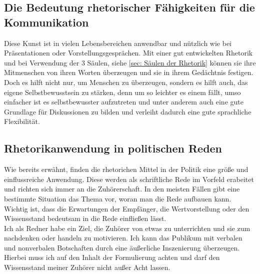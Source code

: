\subsection{Die Bedeutung rhetorischer Fähigkeiten für die Kommunikation}
\label{sec: Die Bedeutung rhetorischer Fähigkeiten für die Kommunikaion}
Diese Kunst ist in vielen Lebensbereichen anwendbar und nützlich wie bei Präsentationen oder Vorstellungsgesprächen. Mit einer gut entwickelten Rhetorik und bei Verwendung der 3 Säulen, siehe \ref{sec: Säulen der Rhetorik}  können sie ihre Mitmenschen von ihren Worten überzeugen und sie in ihrem Gedächtnis festigen. Doch es hilft nicht nur, um Menschen zu überzeugen, sondern es hilft auch, das eigene Selbstbewusstsein zu stärken, denn um so leichter es einem fällt, umso einfacher ist es selbstbewusster aufzutreten und unter anderem auch eine gute Grundlage für Diskussionen zu bilden und verleiht dadurch eine gute sprachliche Flexibilität.

\subsection{Rhetorikanwendung in politischen Reden}
\label{sec:Rhetorikanwendung in politischen Reden}
Wie bereits erwähnt, finden die rhetorichen Mittel in der Politik eine größe und einflussreiche Anwendung. Diese werden als schriftliche Rede im Vorfeld erabeitet und richten sich immer an die Zuhörerschaft. In den meisten Fällen gibt eine bestimmte Situation das Thema vor, woran man die Rede aufbauen kann. Wichtig ist, dass die Erwartungen der Empfänger, die Wertvorstellung oder den Wissensstand bedeutsam in die Rede einfließen lässt. \\Ich als Redner habe ein Ziel, die Zuhörer von etwas zu unterrichten und sie zum nachdenken oder handeln zu motivieren. Ich kann das Publikum mit verbalen und nonverbalen Botschaften durch eine äußerliche Inszenierung überzeugen. Hierbei muss ich auf den Inhalt der Formulierung achten und darf den Wissensstand meiner Zuhörer nicht außer Acht lassen.
